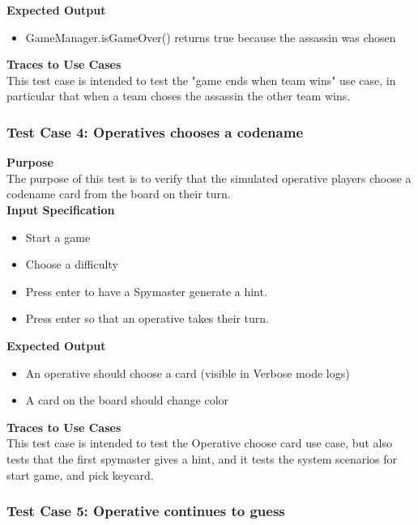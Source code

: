 \documentclass[12pt]{article}
\begin{document}
\noindent
{\bf Expected Output}
\begin{itemize}
    \item GameManager.isGameOver() returns true because the assassin was chosen
\end{itemize}

\noindent
{\bf Traces to Use Cases}\\
This test case is intended to test the "game ends when team wins" use case, in particular that when a team choses the assassin the other team wins.


\subsubsection{Test Case 4: Operatives chooses a codename} \label{tc:2}

\noindent
{\bf Purpose}\\
The purpose of this test is to verify that the simulated operative players choose a codename card from the board on their turn. \\

\noindent
{\bf Input Specification}
\begin{itemize}
    \item Start a game
    \item Choose a difficulty
    \item Press enter to have a Spymaster generate a hint.
    \item Press enter so that an operative takes their turn.
\end{itemize}

\noindent
{\bf Expected Output}
\begin{itemize}
    \item An operative should choose a card (visible in Verbose mode logs)
    \item A card on the board should change color
\end{itemize}

\noindent
{\bf Traces to Use Cases}\\
This test case is intended to test the Operative choose card use case, but also tests that the first spymaster gives a hint, and it tests the system scenarios for start game, and pick keycard.\\

\subsubsection{Test Case 5: Operative continues to guess} \label{tc:2}
\end{document}
